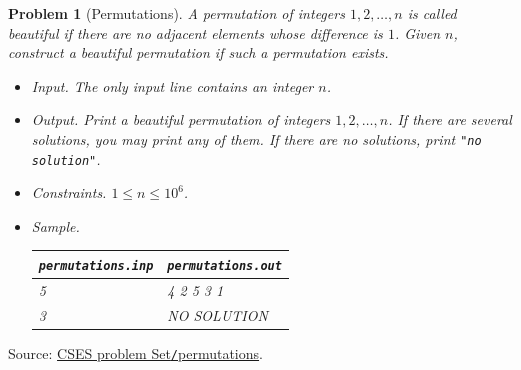 \documentclass{article}
\newtheorem{problem}{Problem}
\begin{document}
\begin{problem}[Permutations]
	A permutation of integers $1,2,\ldots,n$ is called \emph{beautiful} if there are no adjacent elements whose difference is $1$. Given $n$, construct a beautiful permutation if such a permutation exists.
	\begin{itemize}
		\item {\sf Input.} The only input line contains an integer $n$.
		\item {\sf Output.} Print a beautiful permutation of integers $1,2,\ldots,n$. If there are several solutions, you may print any of them. If there are no solutions, print \verb|"no solution"|.
		\item {\sf Constraints.} $1\le n\le10^6$.
		\item {\sf Sample.}
		\begin{table}[H]
			\centering
			\begin{tabular}{|l|l|}
				\hline
				\verb|permutations.inp| & \verb|permutations.out| \\
				\hline
				5 & 4 2 5 3 1 \\
				\hline
				3 & NO SOLUTION \\
				\hline
			\end{tabular}
		\end{table}
	\end{itemize}
\end{problem}
Source: \href{https://cses.fi/problemset/task/1070}{CSES problem Set{\tt/}permutations}.
\end{document}
